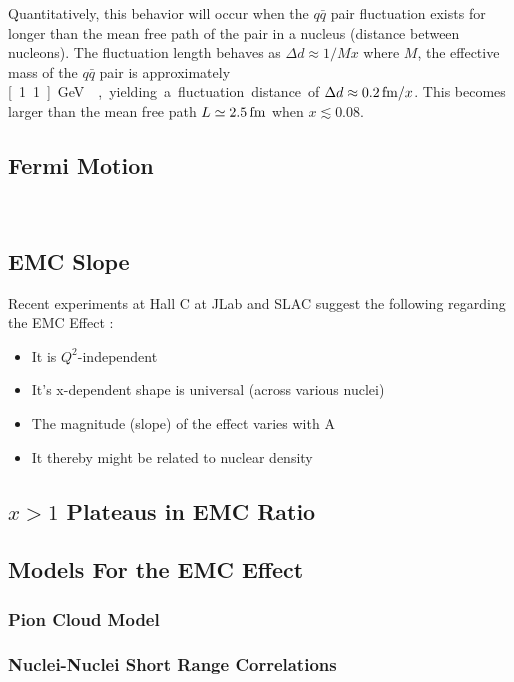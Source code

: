 Quantitatively, this behavior will occur when the $q\bar{q}$ pair fluctuation exists for longer than the mean free path of the pair in a nucleus (distance between nucleons). The fluctuation length behaves as $\Delta d \approx 1/Mx$ where $M$, the effective mass of the $q\bar{q}$ pair is approximately \unit[1.1]{GeV}~\cite{Kopeliovich:2012kw}, yielding a fluctuation distance of $\Delta d \approx \unit[0.2]{fm}/x$. This becomes larger than the mean free path $L\simeq\unit[2.5]{fm}$ when $x\lesssim 0.08$.

\subsection{Fermi Motion}

~\cite{PhysRevD.23.1070}

\subsection{EMC Slope}

Recent experiments at Hall C at JLab and SLAC suggest the following regarding the EMC Effect \cite{Seely:2009gt}:
\begin{itemize}
	\item
	It is $Q^2$-independent
	\item
	It's x-dependent shape is universal (across various nuclei)
	\item
	The magnitude (slope) of the effect varies with A
	\item
	It thereby might be related to nuclear density
\end{itemize}

\subsection{$x>1$ Plateaus in EMC Ratio}

\subsection{Models For the EMC Effect}

\subsubsection{Pion Cloud Model}

\subsubsection{Nuclei-Nuclei Short Range Correlations}

